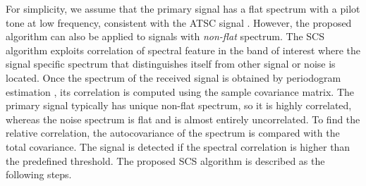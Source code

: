 \documentclass[draftclsnofoot,onecolumn,12pt]{IEEEtran}
\begin{document}
For simplicity, we assume that the primary signal has a flat spectrum with a pilot tone at low frequency, consistent with the ATSC signal \cite{CheGao07, CorGho07}. However, the proposed algorithm can also be applied to signals with {\em non-flat} spectrum.
The SCS algorithm exploits correlation of spectral feature in the band of interest where the signal specific spectrum that distinguishes itself from other signal or noise is located. Once the spectrum of the received signal is obtained by periodogram estimation \cite{ProakisBook96},
its correlation is computed using the sample covariance matrix.
The primary signal typically has unique non-flat spectrum, so it is highly correlated, whereas the noise spectrum is flat and is almost entirely uncorrelated.
To find the relative correlation, the autocovariance of the spectrum is compared with the total covariance.
The signal is detected if the spectral correlation is higher than the predefined threshold.
The proposed SCS algorithm is described as the following steps.
\end{document}
